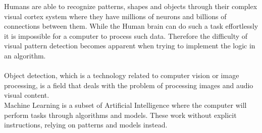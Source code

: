 
Humans are able to recognize patterns, shapes and objects through their complex visual cortex system where they have millions of neurons and
billions of connections between them. While the Human brain can do such a task effortlessly it is impossible for a computer to process such
data. Therefore the difficulty of visual pattern detection becomes apparent when trying to implement the logic in
an algorithm.\cite{neuralnetworksanddeeplearning} \\ \\
Object detection, which is a technology related to computer vision or image processing, is a field that deals with the problem of processing
images and audio visual content.\\
Machine Learning is a subset of Artificial Intelligence where the computer will perform tasks through algorithms and models. These work without explicit instructions, relying on patterns and models instead.

